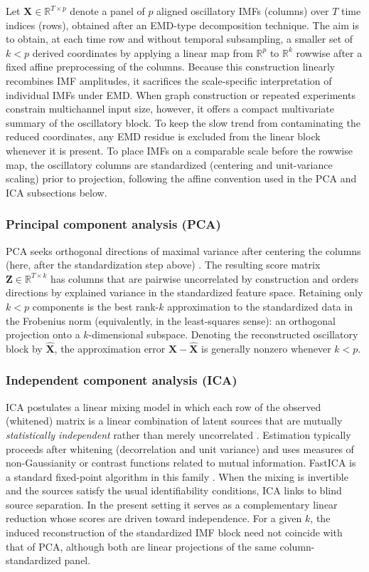 \documentclass[11pt,a4paper]{article}
\begin{document}
Let $\mathbf{X}\in\mathbb{R}^{T\times p}$ denote a panel of $p$ aligned oscillatory IMFs (columns) over $T$ time indices (rows), obtained after an EMD-type decomposition technique. The aim is to obtain, at each time row and without temporal subsampling, a smaller set of $k<p$ derived coordinates by applying a linear map from $\mathbb{R}^{p}$ to $\mathbb{R}^{k}$ rowwise after a fixed affine preprocessing of the columns. Because this construction linearly recombines IMF amplitudes, it sacrifices the scale-specific interpretation of individual IMFs under EMD. When graph construction or repeated experiments constrain multichannel input size, however, it offers a compact multivariate summary of the oscillatory block. To keep the slow trend from contaminating the reduced coordinates, any EMD residue is excluded from the linear block whenever it is present. To place IMFs on a comparable scale before the rowwise map, the oscillatory columns are standardized (centering and unit-variance scaling) prior to projection, following the affine convention used in the PCA and ICA subsections below.

\subsubsection{Principal component analysis (PCA)}
PCA seeks orthogonal directions of maximal variance after centering the columns (here, after the standardization step above) \citep{jolliffe2016principal}. The resulting score matrix $\mathbf{Z}\in\mathbb{R}^{T\times k}$ has columns that are pairwise uncorrelated by construction and orders directions by explained variance in the standardized feature space. Retaining only $k<p$ components is the best rank-$k$ approximation to the standardized data in the Frobenius norm (equivalently, in the least-squares sense): an orthogonal projection onto a $k$-dimensional subspace. Denoting the reconstructed oscillatory block by $\hat{\mathbf{X}}$, the approximation error $\mathbf{X}-\hat{\mathbf{X}}$ is generally nonzero whenever $k<p$.

\subsubsection{Independent component analysis (ICA)}
ICA postulates a linear mixing model in which each row of the observed (whitened) matrix is a linear combination of latent sources that are mutually \emph{statistically independent} rather than merely uncorrelated \citep{hyvarinen2000independent}. Estimation typically proceeds after whitening (decorrelation and unit variance) and uses measures of non-Gaussianity or contrast functions related to mutual information. FastICA is a standard fixed-point algorithm in this family \citep{hyvarinen2000independent}. When the mixing is invertible and the sources satisfy the usual identifiability conditions, ICA links to blind source separation. In the present setting it serves as a complementary linear reduction whose scores are driven toward independence. For a given $k$, the induced reconstruction of the standardized IMF block need not coincide with that of PCA, although both are linear projections of the same column-standardized panel.
\end{document}
